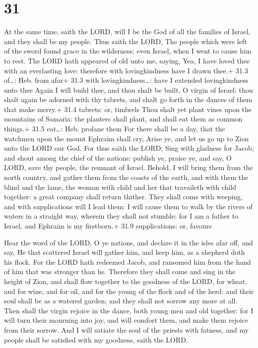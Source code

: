 \hypertarget{section-30}{%
\section{31}\label{section-30}}

 At the same time, saith the LORD, will I be the God of all
the families of Israel, and they shall be my people.  Thus
saith the LORD, The people which were left of the sword found grace in
the wilderness; even Israel, when I went to cause him to rest.
 The LORD hath appeared of old unto me, saying, Yea, I have
loved thee with an everlasting love: therefore with lovingkindness have
I drawn thee.+ 31.3 of\ldots: Heb. from afar+ 31.3 with
lovingkindness\ldots: have I extended lovingkindness unto thee
 Again I will build thee, and thou shalt be built, O virgin
of Israel: thou shalt again be adorned with thy tabrets, and shalt go
forth in the dances of them that make merry.+ 31.4 tabrets: or, timbrels
 Thou shalt yet plant vines upon the mountains of Samaria:
the planters shall plant, and shall eat them as common things.+ 31.5
eat\ldots: Heb. profane them  For there shall be a day, that
the watchmen upon the mount Ephraim shall cry, Arise ye, and let us go
up to Zion unto the LORD our God.  For thus saith the LORD;
Sing with gladness for Jacob, and shout among the chief of the nations:
publish ye, praise ye, and say, O LORD, save thy people, the remnant of
Israel.  Behold, I will bring them from the north country,
and gather them from the coasts of the earth, and with them the blind
and the lame, the woman with child and her that travaileth with child
together: a great company shall return thither.  They shall
come with weeping, and with supplications will I lead them: I will cause
them to walk by the rivers of waters in a straight way, wherein they
shall not stumble: for I am a father to Israel, and Ephraim is my
firstborn.+ 31.9 supplications: or, favours

 Hear the word of the LORD, O ye nations, and declare it
in the isles afar off, and say, He that scattered Israel will gather
him, and keep him, as a shepherd doth his flock.  For the
LORD hath redeemed Jacob, and ransomed him from the hand of him that was
stronger than he.  Therefore they shall come and sing in
the height of Zion, and shall flow together to the goodness of the LORD,
for wheat, and for wine, and for oil, and for the young of the flock and
of the herd: and their soul shall be as a watered garden; and they shall
not sorrow any more at all.  Then shall the virgin rejoice
in the dance, both young men and old together: for I will turn their
mourning into joy, and will comfort them, and make them rejoice from
their sorrow.  And I will satiate the soul of the priests
with fatness, and my people shall be satisfied with my goodness, saith
the LORD.

